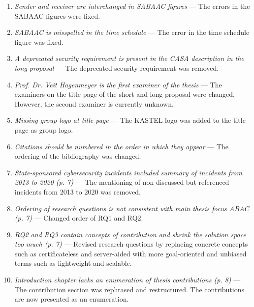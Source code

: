 \begin{enumerate}[label=R\arabic*.]
\begin{enumerate}[label=Q\arabic*.]
        \item \textit{Sender and receiver are interchanged in SABAAC figures} --- The errors in the SABAAC figures were fixed.
        \item \textit{SABAAC is misspelled in the time schedule} --- The error in the time schedule figure was fixed.
        \item \textit{A deprecated security requirement is present in the CASA description in the long proposal} --- The deprecated security requirement was removed.
        \item \textit{Prof. Dr. Veit Hagenmeyer is the first examiner of the thesis} --- The examiners on the title page of the short and long proposal were changed. However, the second examiner is currently unknown.
        \item \textit{Missing group logo at title page} --- The KASTEL logo was added to the title page as group logo.
        \item \textit{Citations should be numbered in the order in which they appear} --- The ordering of the bibliography was changed.
        \item \textit{State-sponsored cybersecurity incidents included summary of incidents from 2013 to 2020 (p. 7)} --- The mentioning of non-discussed but referenced incidents from 2013 to 2020 was removed.
        \item \textit{Ordering of research questions is not consistent with main thesis focus ABAC (p. 7)} --- Changed order of RQ1 and RQ2.
        \item \textit{RQ2 and RQ3 contain concepts of contribution and shrink the solution space too much (p. 7)} --- Revised research questions by replacing concrete concepts such as certificateless and server-aided with more goal-oriented and unbiased terms such as lightweight and scalable.
        \item \textit{Introduction chapter lacks an enumeration of thesis contributions (p. 8)} --- The contribution section was rephrased and restructured. The contributions are now presented as an enumeration.
    \end{enumerate}
\end{enumerate}
